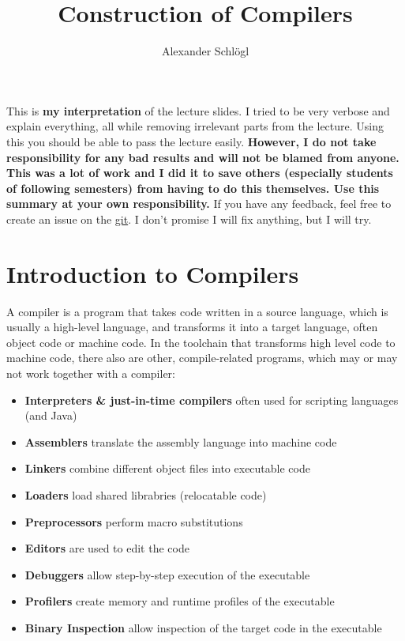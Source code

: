 \documentclass{article}
\title{Construction of Compilers}
\author{Alexander Schlögl}
\begin{document}
\maketitle

\tableofcontents

This is \textbf{my interpretation} of the lecture slides.
I tried to be very verbose and explain everything, all while removing irrelevant parts from the lecture.
Using this you should be able to pass the lecture easily.
\large{\textbf{However, I do not take responsibility for any bad results and will not be blamed from anyone.
This was a lot of work and I did it to save others (especially students of following semesters) from having to do this themselves.
Use this summary at your own responsibility.}}
If you have any feedback, feel free to create an issue on the \href{https://github.com/alxshine/lecture-notes}{git}.
I don't promise I will fix anything, but I will try.
\newpage

\section{Introduction to Compilers}
A compiler is a program that takes code written in a source language, which is usually a high-level language, and transforms it into a target language, often object code or machine code.
In the toolchain that transforms high level code to machine code, there also are other, compile-related programs, which may or may not work together with a compiler:
\begin{itemize}
	\item \textbf{Interpreters \& just-in-time compilers} often used for scripting languages (and Java)
	\item \textbf{Assemblers} translate the assembly language into machine code
	\item \textbf{Linkers} combine different object files into executable code
	\item \textbf{Loaders} load shared librabries (relocatable code)
	\item \textbf{Preprocessors} perform macro substitutions
	\item \textbf{Editors} are used to edit the code
	\item \textbf{Debuggers} allow step-by-step execution of the executable
	\item \textbf{Profilers} create memory and runtime profiles of the executable
	\item \textbf{Binary Inspection} allow inspection of the target code in the executable
\end{itemize}
\end{document}
